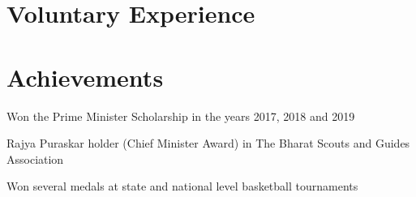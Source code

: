 \documentclass[]{deedy-resume-openfont}
\begin{document}
\begin{minipage}[t]{0.66\textwidth}
%
%

\section{Voluntary Experience}

\sectionsep

\section{Achievements}
\vspace{\topsep}
\begin{tightemize}
\item Won the Prime Minister Scholarship in the years 2017, 2018 and 2019
\item Rajya Puraskar holder (Chief Minister Award) in The Bharat Scouts and Guides
Association
\item Won several medals at state and national level basketball tournaments
\end{tightemize}


\end{minipage} 
\end{document}
